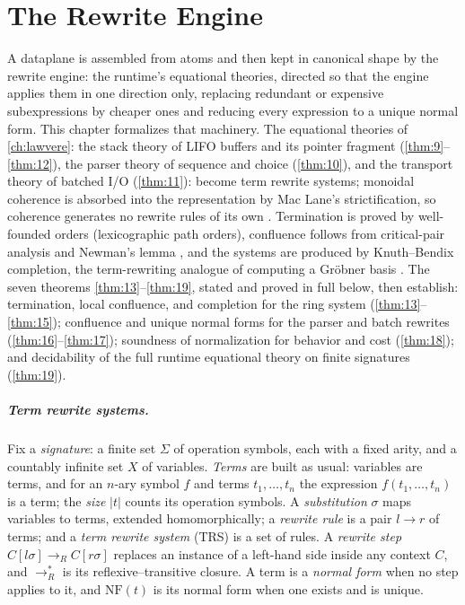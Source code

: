 \chapter{The Rewrite Engine}\label{ch:rewrite}

A dataplane is assembled from atoms and then kept in canonical shape by the
rewrite engine: the runtime's equational theories, directed so that the
engine applies them in one direction only, replacing redundant or expensive
subexpressions by cheaper ones and reducing every expression to a unique
normal form. This chapter formalizes that machinery. The equational theories
of \autoref{ch:lawvere}: the stack theory of LIFO buffers and its pointer
fragment (\autoref{thm:9}--\autoref{thm:12}), the parser theory of sequence and choice
(\autoref{thm:10}), and the transport theory of batched I/O
(\autoref{thm:11}): become term rewrite systems; monoidal coherence is
absorbed into the representation by Mac Lane's strictification, so coherence
generates no rewrite rules of its own \cite{maclane}. Termination is proved
by well-founded orders (lexicographic path orders), confluence follows from
critical-pair analysis and Newman's lemma \cite{newman}, and the systems are
produced by Knuth--Bendix completion, the term-rewriting analogue of
computing a Gr\"obner basis \cite{knuthbendix}. The seven theorems
\autoref{thm:13}--\autoref{thm:19}, stated and proved in full below, then establish: termination,
local confluence, and completion for the ring system (\autoref{thm:13}--\autoref{thm:15});
confluence and unique normal forms for the parser and batch rewrites
(\autoref{thm:16}--\autoref{thm:17}); soundness of normalization for behavior and cost (\autoref{thm:18}); and
decidability of the full runtime equational theory on finite signatures
(\autoref{thm:19}).

\paragraph{Term rewrite systems.}
Fix a \emph{signature}: a finite set $\Sigma$ of operation symbols, each with
a fixed arity, and a countably infinite set $X$ of variables. \emph{Terms}
are built as usual: variables are terms, and for an $n$-ary symbol $f$ and
terms $t_1, \ldots, t_n$ the expression $f (t_1, \ldots, t_n)$ is a term; the
\emph{size} $|t|$ counts its operation symbols. A \emph{substitution}
$\sigma$ maps variables to terms, extended homomorphically; a \emph{rewrite
rule} is a pair $l \to r$ of terms; and a \emph{term rewrite system} (TRS)
is a set of rules. A \emph{rewrite step} $C[l\sigma] \to_R C[r\sigma]$
replaces an instance of a left-hand side inside any context $C$, and
$\to_R^{*}$ is its reflexive--transitive closure. A term is a \emph{normal
form} when no step applies to it, and $\mathrm{NF} (t)$ is its normal form
when one exists and is unique.

